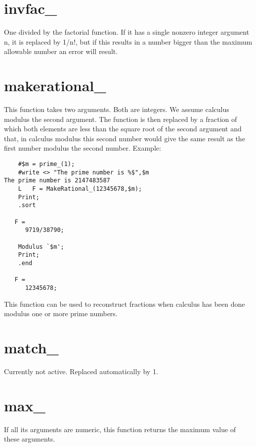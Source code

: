 
\section{invfac\_}
\label{funinvfac}
\noindent One divided by the factorial function. If it has 
a single nonzero integer argument n, it is replaced by 1/n!, but if this 
results in a number bigger than the maximum allowable number an error will 
result.


\section{makerational\_}
\label{funmakerational}

\noindent This function takes two arguments. Both are integers. We assume 
calculus modulus the second argument. The function is then replaced by a 
fraction of which both elements are less than the square root of the second 
argument and that, in calculus modulus this second number would give the 
same result as the first number modulus the second number. Example:
\begin{verbatim}
    #$m = prime_(1);
    #write <> "The prime number is %$",$m
The prime number is 2147483587
    L	F = MakeRational_(12345678,$m);
    Print;
    .sort

   F =
      9719/38790;

    Modulus `$m';
    Print;
    .end

   F =
      12345678;
\end{verbatim}
\noindent This function can be used to reconstruct fractions when calculus 
has been done modulus one or more prime numbers.


\section{match\_}
\label{funmatch}
\noindent Currently not active. Replaced automatically by 1.


\section{max\_}
\label{funmax}
\noindent If all its arguments are numeric, this function returns 
the maximum value of these arguments.

